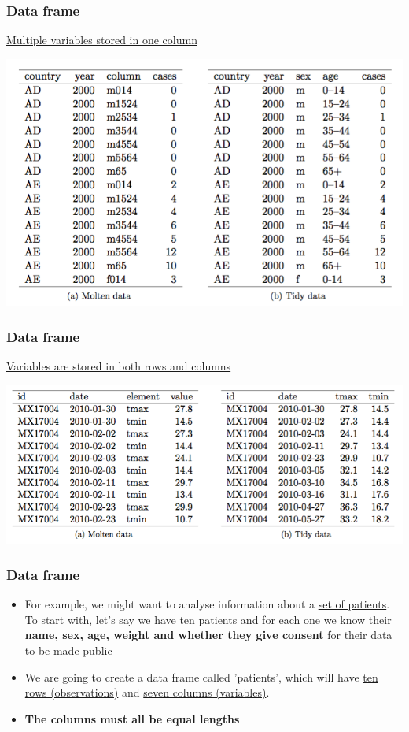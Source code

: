 \documentclass{beamer}
\begin{document}
\begin{frame}[fragile]
	\frametitle{Data frame}
	\centering \large \underline{Multiple variables stored in one column}
	\vspace{5pt}

	\begin{center} \includegraphics{figures/hw_tidy4.png} \end{center}
\end{frame} 


\begin{frame}[fragile]
	\frametitle{Data frame}
	\centering \large \underline{Variables are stored in both rows and columns}
	\vspace{5pt}

	\begin{center} \includegraphics{figures/hw_tidy5.png} \end{center}
\end{frame} 

\begin{frame}[fragile]
	\frametitle{Data frame}
	\begin{itemize}
		\small
	\item For example, we might want to analyse information about a \underline{set of patients}. To start with, let's say we have ten patients and for each one we know their \textbf{name, sex, age, weight and whether they give consent} for their data to be made public
\pause
		\item We are going to create a data frame called 'patients', which will have \underline{ten rows (observations)} and \underline{seven columns (variables)}. 
		\item \textbf{The columns must all be equal lengths}

	\end{itemize}
\end{frame}
\end{document}
